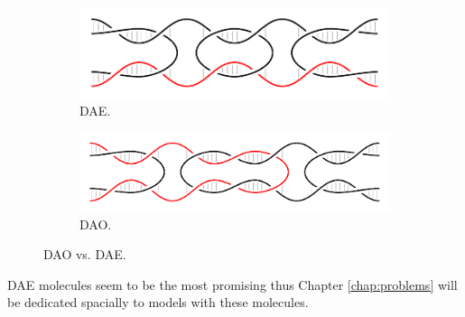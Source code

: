 		\begin{figure}[H]
		\begin{center}
			\begin{subfigure}[b]{0.433\textwidth} %
				\includegraphics[width=\textwidth]{./figures/dao-dae/dae.pdf}
				\caption{DAE.}
				\label{fig:dao}
			\end{subfigure}
			\begin{subfigure}[b]{0.5\textwidth} %
				\includegraphics[width=\textwidth]{./figures/dao-dae/dao.pdf}
				\caption{DAO.}
				\label{fig:dae}
			\end{subfigure}
			\caption{DAO vs. DAE.}
			\label{fig:dao-dae}
		\end{center}
		\end{figure}
		
		
		
		DAE molecules seem to be the most promising %
		thus Chapter \ref{chap:problems} will be dedicated spacially to models with these molecules.
		
		
